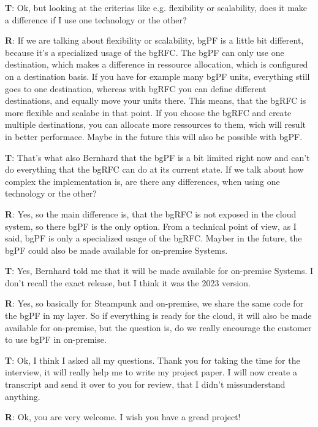 \begin{list}{X:}{\setlength{\labelsep}{5mm}}
 \item[\textbf{T}:] Ok, but looking at the criterias like e.g. flexibility or scalability, does it make a difference if I use one technology or the other?
 \item[\textbf{R}:] If we are talking about flexibility or scalability, bgPF is a little bit different, because it's a specialized usage of the bgRFC. The bgPF can only use one destination, which makes a difference in ressource allocation, which is configured on a destination basis. If you have for example many bgPF units, everything still goes to one destination, whereas with bgRFC you can define different destinations, and equally move your units there. This means, that the bgRFC is more flexible and scalabe in that point. If you choose the bgRFC and create multiple destinations, you can allocate more ressources to them, wich will result in better performace. Maybe in the future this will also be possible with bgPF.
 \item[\textbf{T}:] That's what also Bernhard that the bgPF is a bit limited right now and can't do everything that the bgRFC can do at its current state. If we talk about how complex the implementation is, are there any differences, when using one technology or the other?
 \item[\textbf{R}:] Yes, so the main difference is, that the bgRFC is not exposed in the cloud system, so there bgPF is the only option. From a technical point of view, as I said, bgPF is only a specialized usage of the bgRFC. Mayber in the future, the bgPF could also be made available for on-premise Systems.
 \item[\textbf{T}:] Yes, Bernhard told me that it will be made available for on-premise Systems. I don't recall the exact release, but I think it was the 2023 version.
 \item[\textbf{R}:] Yes, so basically for Steampunk and on-premise, we share the same code for the bgPF in my layer. So if everything is ready for the cloud, it will also be made available for on-premise, but the question is, do we really encourage the customer to use bgPF in on-premise.
 \item[\textbf{T}:] Ok, I think I asked all my questions. Thank you for taking the time for the interview, it will really help me to write my project paper. I will now create a transcript and send it over to you for review, that I didn't missunderstand anything. 
 \item[\textbf{R}:] Ok, you are very welcome. I wish you have a gread project!
\end{list}